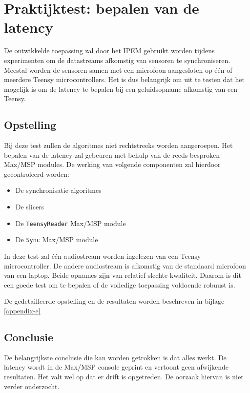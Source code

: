 \section{Praktijktest: bepalen van de latency}
\label{praktijktest}

De ontwikkelde toepassing zal door het IPEM gebruikt worden tijdens experimenten om de datastreams afkomstig van sensoren te synchroniseren. Meestal worden de sensoren samen met een microfoon aangesloten op één of meerdere Teensy microcontrollers. Het is dus belangrijk om uit te testen dat het mogelijk is om de latency te bepalen bij een geluidsopname afkomstig van een Teensy.

\subsection{Opstelling}

Bij deze test zullen de algoritmes niet rechtstreeks worden aangeroepen. Het bepalen van de latency zal gebeuren met behulp van de reeds besproken Max/MSP modules. De werking van volgende componenten zal hierdoor gecontroleerd worden:
\begin{itemize}[noitemsep]
	\item De synchronisatie algoritmes
	\item De slicers
	\item De \texttt{TeensyReader} Max/MSP module
	\item De \texttt{Sync} Max/MSP module
\end{itemize}

In deze test zal één audiostream worden ingelezen van een Teensy microcontroller. De andere audiostream is afkomstig van de standaard microfoon van een laptop. Beide opnames zijn van relatief slechte kwaliteit. Daarom is dit een goede test om te bepalen of de volledige toepassing voldoende robuust is.

De gedetailleerde opstelling en de resultaten worden beschreven in bijlage \ref{appendix-e}

\subsection{Conclusie}

De belangrijkste conclusie die kan worden getrokken is dat alles werkt. De latency wordt in de Max/MSP console geprint en vertoont geen afwijkende resultaten. Het valt wel op dat er drift is opgetreden. De oorzaak hiervan is niet verder onderzocht. 

